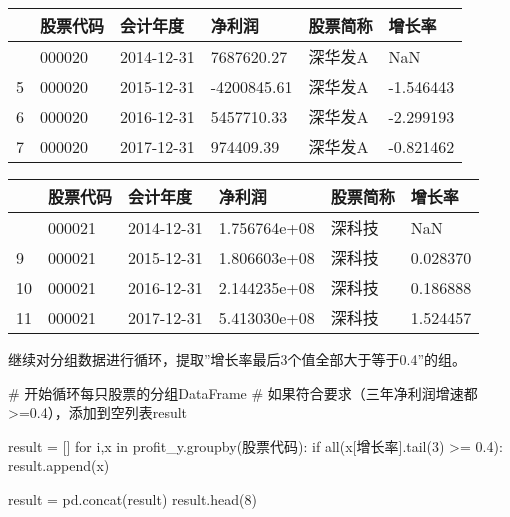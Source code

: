 \documentclass[
  letterpaper,
  DIV=11,
  numbers=noendperiod]{scrreprt}
\newenvironment{Shaded}{\begin{snugshade}}{\end{snugshade}}
\newcommand{\BuiltInTok}[1]{\textcolor[rgb]{0.00,0.23,0.31}{#1}}
\newcommand{\CommentTok}[1]{\textcolor[rgb]{0.37,0.37,0.37}{#1}}
\newcommand{\ControlFlowTok}[1]{\textcolor[rgb]{0.00,0.23,0.31}{#1}}
\newcommand{\DecValTok}[1]{\textcolor[rgb]{0.68,0.00,0.00}{#1}}
\newcommand{\FloatTok}[1]{\textcolor[rgb]{0.68,0.00,0.00}{#1}}
\newcommand{\KeywordTok}[1]{\textcolor[rgb]{0.00,0.23,0.31}{#1}}
\newcommand{\NormalTok}[1]{\textcolor[rgb]{0.00,0.23,0.31}{#1}}
\newcommand{\OperatorTok}[1]{\textcolor[rgb]{0.37,0.37,0.37}{#1}}
\newcommand{\StringTok}[1]{\textcolor[rgb]{0.13,0.47,0.30}{#1}}
\begin{document}
\begin{longtable}[]{@{}llllll@{}}
\toprule\noalign{}
& 股票代码 & 会计年度 & 净利润 & 股票简称 & 增长率 \\
\midrule\noalign{}
\endhead
\bottomrule\noalign{}
\endlastfoot
4 & 000020 & 2014-12-31 & 7687620.27 & 深华发A & NaN \\
5 & 000020 & 2015-12-31 & -4200845.61 & 深华发A & -1.546443 \\
6 & 000020 & 2016-12-31 & 5457710.33 & 深华发A & -2.299193 \\
7 & 000020 & 2017-12-31 & 974409.39 & 深华发A & -0.821462 \\
\end{longtable}

\begin{longtable}[]{@{}llllll@{}}
\toprule\noalign{}
& 股票代码 & 会计年度 & 净利润 & 股票简称 & 增长率 \\
\midrule\noalign{}
\endhead
\bottomrule\noalign{}
\endlastfoot
8 & 000021 & 2014-12-31 & 1.756764e+08 & 深科技 & NaN \\
9 & 000021 & 2015-12-31 & 1.806603e+08 & 深科技 & 0.028370 \\
10 & 000021 & 2016-12-31 & 2.144235e+08 & 深科技 & 0.186888 \\
11 & 000021 & 2017-12-31 & 5.413030e+08 & 深科技 & 1.524457 \\
\end{longtable}

继续对分组数据进行循环，提取''增长率最后3个值全部大于等于0.4''的组。

\begin{Shaded}
\begin{Highlighting}[]
\CommentTok{\# 开始循环每只股票的分组DataFrame}
\CommentTok{\# 如果符合要求（三年净利润增速都\textgreater{}=0.4），添加到空列表result}

\NormalTok{result }\OperatorTok{=}\NormalTok{ []}
\ControlFlowTok{for}\NormalTok{ i,x }\KeywordTok{in}\NormalTok{ profit\_y.groupby(}\StringTok{\textquotesingle{}股票代码\textquotesingle{}}\NormalTok{):}
    \ControlFlowTok{if} \BuiltInTok{all}\NormalTok{(x[}\StringTok{\textquotesingle{}增长率\textquotesingle{}}\NormalTok{].tail(}\DecValTok{3}\NormalTok{) }\OperatorTok{\textgreater{}=} \FloatTok{0.4}\NormalTok{):}
\NormalTok{        result.append(x)}

\NormalTok{result }\OperatorTok{=}\NormalTok{ pd.concat(result)}
\NormalTok{result.head(}\DecValTok{8}\NormalTok{)}
\end{Highlighting}
\end{Shaded}
\end{document}
